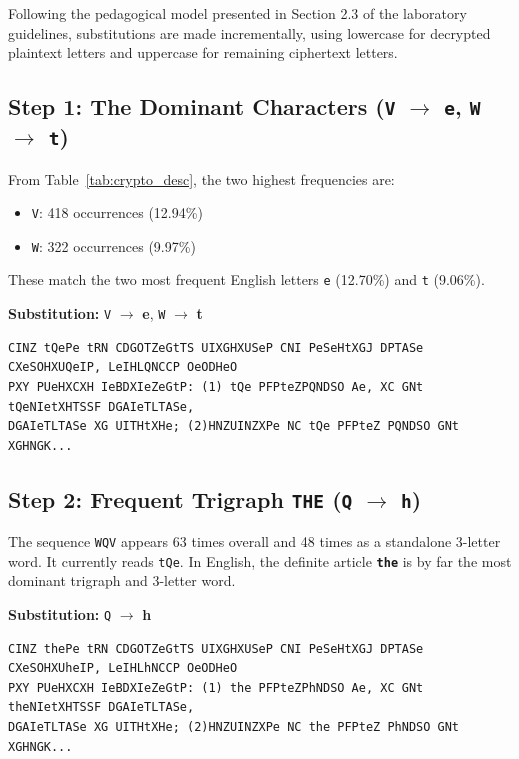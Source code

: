 \documentclass[12pt,a4paper]{article}
\begin{document}
Following the pedagogical model presented in Section 2.3 of the laboratory guidelines, substitutions are made incrementally, using lowercase for decrypted plaintext letters and uppercase for remaining ciphertext letters.

\subsection{Step 1: The Dominant Characters (\texorpdfstring{\texttt{V} $\to$ \texttt{e}, \texttt{W} $\to$ \texttt{t}}{V -> e, W -> t})}
From Table~\ref{tab:crypto_desc}, the two highest frequencies are:
\begin{itemize}
    \item \texttt{V}: 418 occurrences (12.94\%)
    \item \texttt{W}: 322 occurrences (9.97\%)
\end{itemize}
These match the two most frequent English letters \texttt{e} (12.70\%) and \texttt{t} (9.06\%).
\begin{center}
    \textbf{Substitution:} \texttt{V} $\to$ \textbf{e}, \texttt{W} $\to$ \textbf{t}
\end{center}

\begin{lstlisting}[caption={Text snippet after Step 1}]
CINZ tQePe tRN CDGOTZeGtTS UIXGHXUSeP CNI PeSeHtXGJ DPTASe CXeSOHXUQeIP, LeIHLQNCCP OeODHeO 
PXY PUeHXCXH IeBDXIeZeGtP: (1) tQe PFPteZPQNDSO Ae, XC GNt tQeNIetXHTSSF DGAIeTLTASe, 
DGAIeTLTASe XG UITHtXHe; (2)HNZUINZXPe NC tQe PFPteZ PQNDSO GNt XGHNGK...
\end{lstlisting}

\subsection{Step 2: Frequent Trigraph \texttt{THE} (\texorpdfstring{\texttt{Q} $\to$ \texttt{h}}{Q -> h})}
The sequence \texttt{WQV} appears 63 times overall and 48 times as a standalone 3-letter word. It currently reads \texttt{tQe}. In English, the definite article \textbf{\texttt{the}} is by far the most dominant trigraph and 3-letter word.
\begin{center}
    \textbf{Substitution:} \texttt{Q} $\to$ \textbf{h}
\end{center}

\begin{lstlisting}[caption={Text snippet after Step 2}]
CINZ thePe tRN CDGOTZeGtTS UIXGHXUSeP CNI PeSeHtXGJ DPTASe CXeSOHXUheIP, LeIHLhNCCP OeODHeO 
PXY PUeHXCXH IeBDXIeZeGtP: (1) the PFPteZPhNDSO Ae, XC GNt theNIetXHTSSF DGAIeTLTASe, 
DGAIeTLTASe XG UITHtXHe; (2)HNZUINZXPe NC the PFPteZ PhNDSO GNt XGHNGK...
\end{lstlisting}
\end{document}
